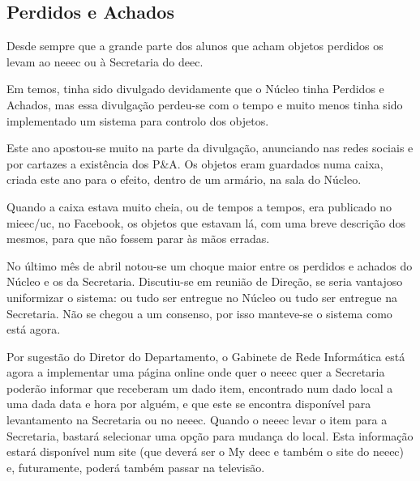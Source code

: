 
\subsection{Perdidos e Achados}

Desde sempre que a grande parte dos alunos que acham objetos perdidos os levam ao \acrshort{neeec} ou à Secretaria do \acrshort{deec}.

Em temos, tinha sido divulgado devidamente que o Núcleo tinha Perdidos e Achados, mas essa divulgação perdeu-se com o tempo e muito menos tinha sido implementado um sistema para controlo dos objetos.

Este ano apostou-se muito na parte da divulgação, anunciando nas redes sociais e por cartazes a existência dos P\&A. Os objetos eram guardados numa caixa, criada este ano para o efeito, dentro de um armário, na sala do Núcleo.

Quando a caixa estava muito cheia, ou de tempos a tempos, era publicado no \acrshort{mieec}/\acrshort{uc}, no Facebook, os objetos que estavam lá, com uma breve descrição dos mesmos, para que não fossem parar às mãos erradas.

No último mês de abril notou-se um choque maior entre os perdidos e achados do Núcleo e os da Secretaria. Discutiu-se em reunião de Direção, se seria vantajoso uniformizar o sistema: ou tudo ser entregue no Núcleo ou tudo ser entregue na Secretaria. Não se chegou a um consenso, por isso manteve-se o sistema como está agora.

Por sugestão do Diretor do Departamento, o Gabinete de Rede Informática está agora a implementar uma página online onde quer o \acrshort{neeec} quer a Secretaria poderão informar que receberam um dado item, encontrado num dado local a uma dada data e hora por alguém, e que este se encontra disponível para levantamento na Secretaria ou no \acrshort{neeec}. Quando o \acrshort{neeec} levar o item para a Secretaria, bastará selecionar uma opção para mudança do local. Esta informação estará disponível num site (que deverá ser o My \acrshort{deec} e também o site do \acrshort{neeec}) e, futuramente, poderá também passar na televisão.